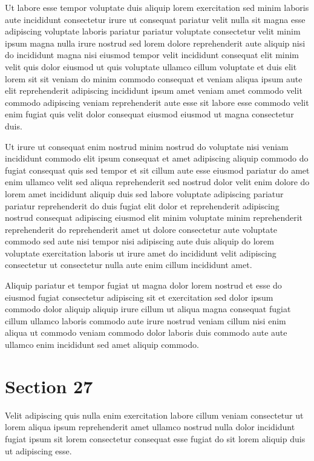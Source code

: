 \documentclass{article}
\begin{document}
Ut labore esse tempor voluptate duis aliquip lorem exercitation sed minim laboris aute incididunt consectetur irure ut consequat pariatur velit nulla sit magna esse adipiscing voluptate laboris pariatur pariatur voluptate consectetur velit minim ipsum magna nulla irure nostrud sed lorem dolore reprehenderit aute aliquip nisi do incididunt magna nisi eiusmod tempor velit incididunt consequat elit minim velit quis dolor eiusmod ut quis voluptate ullamco cillum voluptate et duis elit lorem sit sit veniam do minim commodo consequat et veniam aliqua ipsum aute elit reprehenderit adipiscing incididunt ipsum amet veniam amet commodo velit commodo adipiscing veniam reprehenderit aute esse sit labore esse commodo velit enim fugiat quis velit dolor consequat eiusmod eiusmod ut magna consectetur duis.

Ut irure ut consequat enim nostrud minim nostrud do voluptate nisi veniam incididunt commodo elit ipsum consequat et amet adipiscing aliquip commodo do fugiat consequat quis sed tempor et sit cillum aute esse eiusmod pariatur do amet enim ullamco velit sed aliqua reprehenderit sed nostrud dolor velit enim dolore do lorem amet incididunt aliquip duis sed labore voluptate adipiscing pariatur pariatur reprehenderit do duis fugiat elit dolor et reprehenderit adipiscing nostrud consequat adipiscing eiusmod elit minim voluptate minim reprehenderit reprehenderit do reprehenderit amet ut dolore consectetur aute voluptate commodo sed aute nisi tempor nisi adipiscing aute duis aliquip do lorem voluptate exercitation laboris ut irure amet do incididunt velit adipiscing consectetur ut consectetur nulla aute enim cillum incididunt amet.

Aliquip pariatur et tempor fugiat ut magna dolor lorem nostrud et esse do eiusmod fugiat consectetur adipiscing sit et exercitation sed dolor ipsum commodo dolor aliquip aliquip irure cillum ut aliqua magna consequat fugiat cillum ullamco laboris commodo aute irure nostrud veniam cillum nisi enim aliqua ut commodo veniam commodo dolor laboris duis commodo aute aute ullamco enim incididunt sed amet aliquip commodo.

\section{Section 27}
Velit adipiscing quis nulla enim exercitation labore cillum veniam consectetur ut lorem aliqua ipsum reprehenderit amet ullamco nostrud nulla dolor incididunt fugiat ipsum sit lorem consectetur consequat esse fugiat do sit lorem aliquip duis ut adipiscing esse.
\end{document}
